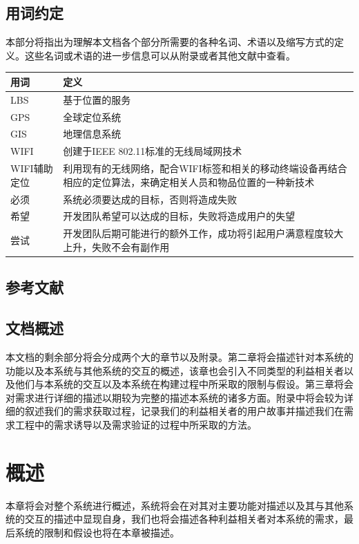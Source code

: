 \documentclass{ctexrep}
\begin{document}
\section{用词约定}
本部分将指出为理解本文档各个部分所需要的各种名词、术语以及缩写方式的定义。这些名词或术语的进一步信息可以从附录或者其他文献中查看。
\begin{longtable}{p{2cm}|p{10cm}}
\hline
用词 & 定义 \\
\hline
\hline
LBS & 基于位置的服务\\
\hline
GPS & 全球定位系统 \\
\hline
GIS & 地理信息系统 \\
\hline
WIFI & 创建于IEEE 802.11标准的无线局域网技术 \\
\hline
WIFI辅助定位 & 利用现有的无线网络，配合WIFI标签和相关的移动终端设备再结合相应的定位算法，来确定相关人员和物品位置的一种新技术 \\
\hline
必须 & 系统必须要达成的目标，否则将造成失败 \\
\hline
希望 & 开发团队希望可以达成的目标，失败将造成用户的失望 \\
\hline
尝试 & 开发团队后期可能进行的额外工作，成功将引起用户满意程度较大上升，失败不会有副作用 \\
\hline
\end{longtable}
\section{参考文献}

\section{文档概述}
本文档的剩余部分将会分成两个大的章节以及附录。第二章将会描述针对本系统的功能以及本系统与其他系统的交互的概述，该章也会引入不同类型的利益相关者以及他们与本系统的交互以及本系统在构建过程中所采取的限制与假设。第三章将会对需求进行详细的描述以期较为完整的描述本系统的诸多方面。附录中将会较为详细的叙述我们的需求获取过程，记录我们的利益相关者的用户故事并描述我们在需求工程中的需求诱导以及需求验证的过程中所采取的方法。



\chapter{概述}
本章将会对整个系统进行概述，系统将会在对其对主要功能对描述以及其与其他系统的交互的描述中显现自身，我们也将会描述各种利益相关者对本系统的需求，最后系统的限制和假设也将在本章被描述。
\end{document}
